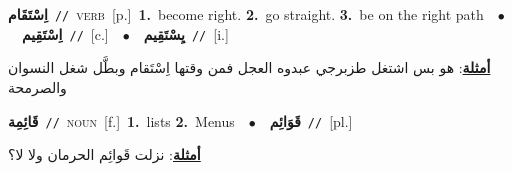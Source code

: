 \documentclass[10pt,a4paper,twoside]{article} %
\begin{document}
\begin{multicols}{2}
{\setlength\topsep{0pt}\textbf{\foreignlanguage{arabic}{اِسْتَقَام}}\ {\color{gray}\texttt{//}\color{black}}\ \textsc{verb}\ [p.]\ \textbf{1.}~become right.  \textbf{2.}~go straight.  \textbf{3.}~be on the right path\ \ $\bullet$\ \ \setlength\topsep{0pt}\textbf{\foreignlanguage{arabic}{اِسْتَقِيم}}\ {\color{gray}\texttt{//}\color{black}}\ [c.]\ \ $\bullet$\ \ \setlength\topsep{0pt}\textbf{\foreignlanguage{arabic}{يِسْتَقِيم}}\ {\color{gray}\texttt{//}\color{black}}\ [i.]\  \begin{flushright}\color{gray}\foreignlanguage{arabic}{\textbf{\underline{\foreignlanguage{arabic}{أمثلة}}}: هو بس اشتغل طزبرجي عبدوه العجل فمن وقتها اِسْتَقام وبطَّل شغل النسوان والصرمحة}\end{flushright}\color{black}} \vspace{2mm}

{\setlength\topsep{0pt}\textbf{\foreignlanguage{arabic}{قَائِمِة}}\ {\color{gray}\texttt{//}\color{black}}\ \textsc{noun}\ [f.]\ \textbf{1.}~lists  \textbf{2.}~Menus\ \ $\bullet$\ \ \setlength\topsep{0pt}\textbf{\foreignlanguage{arabic}{قَوَائِم}}\ {\color{gray}\texttt{//}\color{black}}\ [pl.]\  \begin{flushright}\color{gray}\foreignlanguage{arabic}{\textbf{\underline{\foreignlanguage{arabic}{أمثلة}}}: نزلت قَوائِم الحرمان ولا لا؟}\end{flushright}\color{black}} \vspace{2mm}


\end{multicols}
\end{document}
